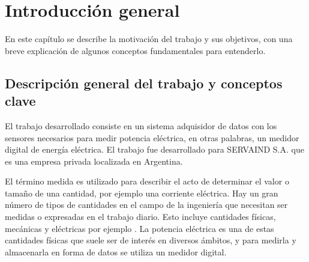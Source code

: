 
\chapter{Introducción general} %
En este capítulo se describe la motivación del trabajo y sus objetivos, con una breve explicación de algunos conceptos fundamentales para entenderlo.

\label{Chapter1} %


\newcommand{\keyword}[1]{\textbf{#1}}
\newcommand{\tabhead}[1]{\textbf{#1}}
\newcommand{\code}[1]{\texttt{#1}}
\newcommand{\file}[1]{\texttt{\bfseries#1}}
\newcommand{\option}[1]{\texttt{\itshape#1}}
\newcommand{\grados}{$^{\circ}$}



\section{Descripción general del trabajo y conceptos clave}

El trabajo desarrollado consiste en un sistema adquisidor de datos con los sensores necesarios para medir potencia eléctrica, en otras palabras, un medidor digital de energía eléctrica. El trabajo fue desarrollado para SERVAIND S.A. que es una empresa privada localizada en Argentina.

El término medida es utilizado para describir el acto de determinar el valor o tamaño de una cantidad, por ejemplo una corriente eléctrica. Hay un gran número de tipos de cantidades en el campo de la ingeniería que necesitan ser medidas o expresadas en el trabajo diario. Esto incluye cantidades físicas, mecánicas y eléctricas por ejemplo \citep{book:1689974}. La potencia eléctrica es una de estas cantidades físicas que suele ser de interés en diversos ámbitos, y para medirla y almacenarla en forma de datos se utiliza un medidor digital.

